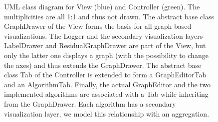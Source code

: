 \begin{figure}[htb!]
\caption{UML class diagram for View (blue) and Controller (green). The multiplicities are all 1:1 and thus not drawn. The abstract base class GraphDrawer of the View forms the basis for all graph-based visualizations. The Logger and the secondary visualization layers LabelDrawer and ResidualGraphDrawer are part of the View, but only the latter one displays a graph (with the possibility to change the axes) and thus extends the GraphDrawer. The abstract base class Tab of the Controller is extended to form a GraphEditorTab and an AlgorithmTab. Finally, the actual GraphEditor and the two implemented algorithms are associated with a Tab while inheriting from the GraphDrawer. Each algorithm has a secondary visualization layer, we model this relationship with an aggregation.}
\label{fig:viewcontroller}
\end{figure}



